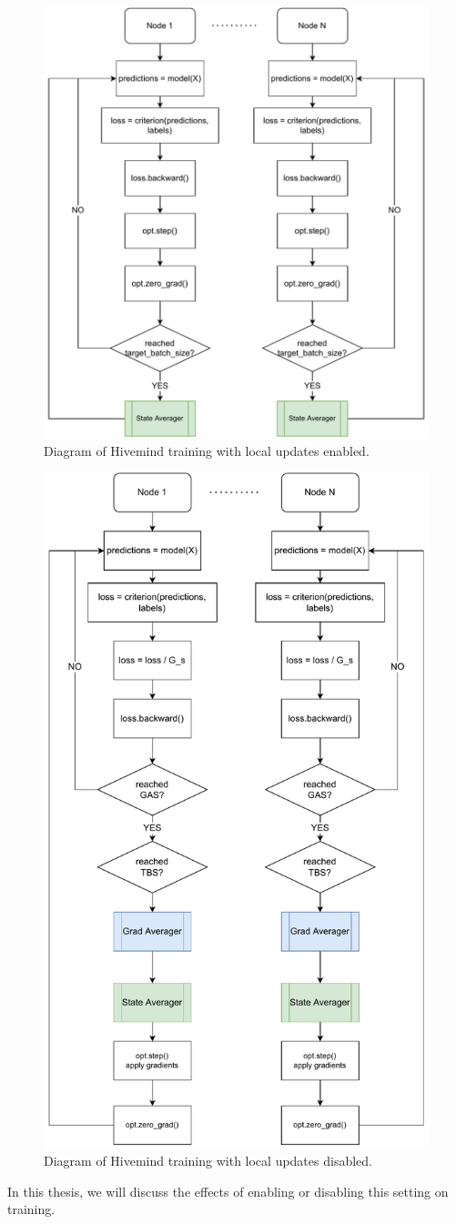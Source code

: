 \begin{figure}[h]
    \centering
    \caption{Diagram of Hivemind training with local updates enabled.}
    \label{fig:use-local-updates_true}
    \includegraphics[width=0.8 \textwidth]{./figures/02_use-local-updates_true.pdf}
\end{figure}

\begin{figure}[h]
    \centering
    \caption{Diagram of Hivemind training with local updates disabled.}
    \label{fig:use-local-updates_false}
    \includegraphics[width=0.7 \textwidth]{./figures/02_use-local-updates_false.pdf}
\end{figure}


In this thesis, we will discuss the effects of enabling or disabling this setting on training.
